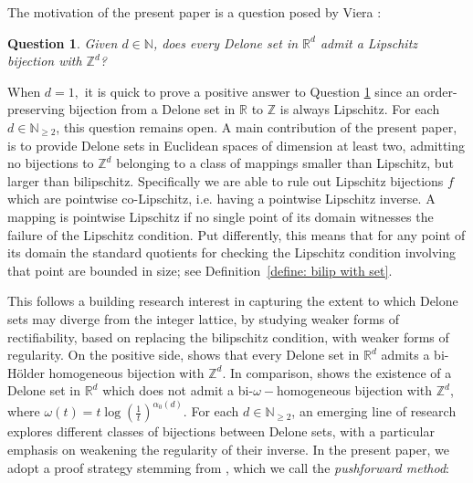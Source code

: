 \documentclass{article}
\newtheorem{question}[define]{Question}
\newcommand{\R}{\mathbb{R}}
\newcommand{\Z}{\mathbb{Z}}
\newcommand{\N}{\mathbb{N}}
\begin{document}
The motivation of the present paper is a question posed by Viera \cite[pg. 3]{viera2023delone}:
\begin{question} \label{question: lipschitz}
    Given $d \in \N$, does every Delone set in $\R^d$ admit a Lipschitz bijection with $\Z^d$?
\end{question}
 When $d = 1,$ it is quick to prove a positive answer to Question \ref{question: lipschitz} since an order-preserving bijection from a Delone set in $\R$ to $\Z$ is always Lipschitz. For each $d \in \N_{\geq 2}$, this question remains open. A main contribution of the present paper, is to provide Delone sets in Euclidean spaces of dimension at least two, admitting no bijections to $\Z^{d}$ belonging to a class of mappings smaller than Lipschitz, but larger than bilipschitz. Specifically we are able to rule out Lipschitz bijections $f$ which are pointwise co-Lipschitz, i.e. having a pointwise Lipschitz inverse. A mapping is pointwise Lipschitz if no single point of its domain witnesses the failure of the Lipschitz condition. Put differently, this means that for any point of its domain the standard quotients for checking the Lipschitz condition involving that point are bounded in size; see Definition~\ref{define: bilip with set}.
 
This follows a building research interest in capturing the extent to which Delone sets may diverge from the integer lattice, by studying weaker forms of rectifiability, based on replacing the bilipschitz condition, with weaker forms of regularity. On the positive side, \cite[Theorem $5.1$]{mcmullen1998lipschitz} shows that every Delone set in $\R^d$ admits a bi-H\"{o}lder homogeneous bijection with $\Z^d$. In comparison, \cite[Theorem $1.2$]{dymond2023highly} shows the existence of a Delone set in $\R^d$ which does not admit a bi-$\omega-$homogeneous bijection with $\Z^d$, where $\omega(t) = t\log(\frac{1}{t})^{\alpha_0(d)}.$
For each $d \in \N_{\geq 2}$, an emerging line of research explores different classes of bijections between Delone sets, with a particular emphasis on weakening the regularity of their inverse. In the present paper, we adopt a proof strategy stemming from \cite{burago1998separated,mcmullen1998lipschitz}, which we call the \emph{pushforward method}: 
\end{document}
